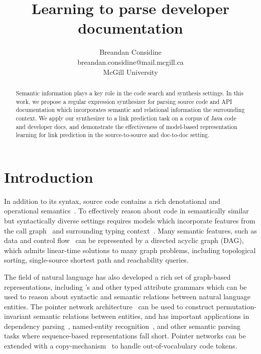 \documentclass{article}
\title{Learning to parse developer documentation}
\author{Breandan Considine\\
breandan.considine@mail.mcgill.ca\\
McGill University}
\begin{document}
\maketitle

\begin{abstract}
Semantic information plays a key role in the code search and synthesis settings. In this work, we propose a regular expression synthesizer for parsing source code and API documentation which incorporates semantic and relational information the surrounding context. We apply our synthesizer to a link prediction task on a corpus of Java code and developer docs, and demonstrate the effectiveness of model-based representation learning for link prediction in the source-to-source and doc-to-doc setting.
\end{abstract}

\section{Introduction}

In addition to its syntax, source code contains a rich denotational and operational semantics~\citep{henkel2018code}. To effectively reason about code in semantically similar but syntactically diverse settings requires models which incorporate features from the call graph~\citep{gu2016deep, liu2019neural} and surrounding typing context~\citep{allamanis2017learning}. Many semantic features, such as data and control flow~\citep{si2018learning} can be represented by a directed acyclic graph (DAG), which admits linear-time solutions to many graph problems, including topological sorting, single-source shortest path and reachability queries.

The field of natural language has also developed a rich set of graph-based representations, including \citet{reddy2016transforming}'s and other typed attribute grammars which can be used to reason about syntactic and semantic relations between natural language entities. The pointer network architecture~\citep{vinyals2015pointer, vinyals2015order} can be used to construct permutation-invariant semantic relations between entities, and has important applications in dependency parsing~\citep{ma2018stack}, named-entity recognition~\citep{lample2016neural}, and other semantic parsing tasks where sequence-based representations fall short. Pointer networks can be extended with a copy-mechanism~\citep{li2017code} to handle out-of-vocabulary code tokens.
\end{document}
